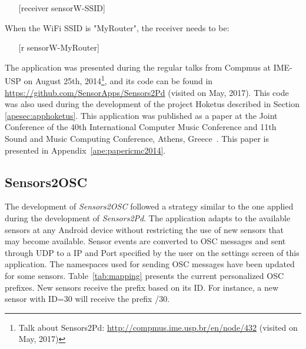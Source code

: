 \begin{itemize}\itemsep0em
	\item[]    [receiver sensorW-{SSID}]
\end{itemize}

When the WiFi SSID is "MyRouter", the receiver needs to be:

\begin{itemize}\itemsep0em
	\item[]    [r sensorW-MyRouter]
\end{itemize}

The application was presented during the regular talks from Compmus at IME-USP on August 25th, 2014\footnote{Talk about Sensors2Pd: \url{http://compmus.ime.usp.br/en/node/432} (visited on May, 2017)}, and its code can be found in \url{https://github.com/SensorApps/Sensors2Pd} (visited on May, 2017).
This code was also used during the development of the project Hoketus described in Section \ref{apesec:apphoketus}.
This application was published as a paper at the Joint Conference of the 40th International Computer Music Conference and 11th Sound and Music Computing Conference, Athens, Greece~\citep{deCarvalhoJunior2014sensors2pd}.
This paper is presented in Appendix~\ref{ape:papericmc2014}.

\subsection*{Sensors2OSC}
\label{apesubsec:appsensors2osc}

The development of \textit{Sensors2OSC} followed a strategy similar to the one applied during the development of \textit{Sensors2Pd}.
The application adapts to the available sensors at any Android device without restricting the use of new sensors that may become available.
Sensor events are converted to OSC messages and sent through UDP to a IP and Port specified by the user on the settings screen of this application.
The namespaces used for sending OSC messages have been updated for some sensors.
Table~\ref{tab:mapping} presents the current personalized OSC prefixes.
New sensors receive the prefix based on its ID. For instance, a new sensor with ID=30 will receive the prefix /30.

